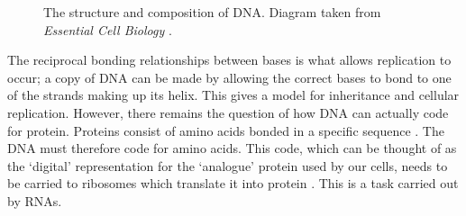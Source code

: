 \documentclass{cshonours}
\begin{document}
\begin{figure}
\begin{center}
\end{center}
\caption{The structure and composition of DNA. Diagram taken from \emph{Essential Cell Biology} \cite{albertsessential}.}
\label{dna}
\end{figure}

The reciprocal bonding relationships between bases is what allows replication to occur; a copy of DNA can be made by allowing the correct bases to bond to one of the strands making up its helix. This gives a model for inheritance and cellular replication. However, there remains the question of how DNA can actually code for protein. Proteins consist of amino acids bonded in a specific sequence \cite{albertsessential}. The DNA must therefore code for amino acids. This code, which can be thought of as the `digital' representation for the `analogue' protein used by our cells, needs to be carried to ribosomes which translate it into protein \cite{albertsessential}. This is a task carried out by RNAs. 
\end{document}
